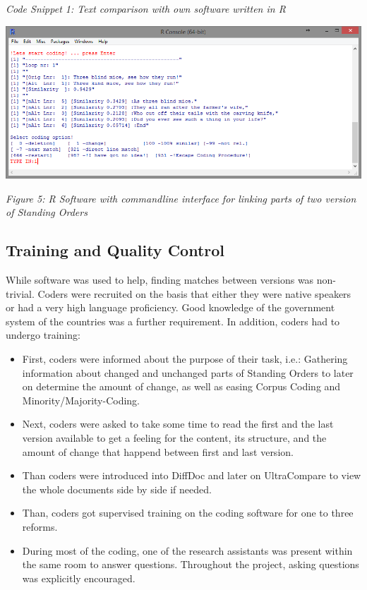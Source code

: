 \documentclass[10pt,]{article}
\providecommand{\tightlist}{%
  \setlength{\itemsep}{0pt}\setlength{\parskip}{0pt}}
\begin{document}
\emph{Code Snippet 1: Text comparison with own software written in R}

\begin{center}
\includegraphics[width=\textwidth]{fig/linkage.png}
\end{center}

\emph{Figure 5: R Software with commandline interface for linking parts
of two version of Standing Orders}

\subsection{Training and Quality
Control}\label{training-and-quality-control}

While software was used to help, finding matches between versions was
non-trivial. Coders were recruited on the basis that either they were
native speakers or had a very high language proficiency. Good knowledge
of the government system of the countries was a further requirement. In
addition, coders had to undergo training:

\begin{itemize}
\tightlist
\item
  First, coders were informed about the purpose of their task, i.e.:
  Gathering information about changed and unchanged parts of Standing
  Orders to later on determine the amount of change, as well as easing
  Corpus Coding and Minority/Majority-Coding.
\item
  Next, coders were asked to take some time to read the first and the
  last version available to get a feeling for the content, its
  structure, and the amount of change that happend between first and
  last version.
\item
  Than coders were introduced into DiffDoc and later on UltraCompare to
  view the whole documents side by side if needed.
\item
  Than, coders got supervised training on the coding software for one to
  three reforms.
\item
  During most of the coding, one of the research assistants was present
  within the same room to answer questions. Throughout the project,
  asking questions was explicitly encouraged.
\end{itemize}
\end{document}

